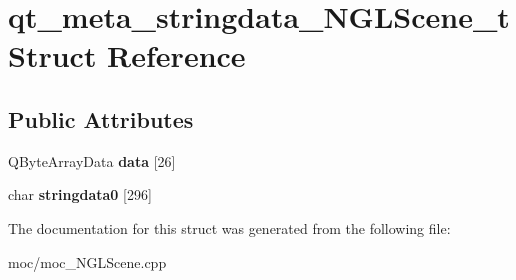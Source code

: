\hypertarget{structqt__meta__stringdata__NGLScene__t}{\section{qt\-\_\-meta\-\_\-stringdata\-\_\-\-N\-G\-L\-Scene\-\_\-t Struct Reference}
\label{structqt__meta__stringdata__NGLScene__t}
}
\subsection*{Public Attributes}
\begin{DoxyCompactItemize}
\item 
\hypertarget{structqt__meta__stringdata__NGLScene__t_a728fa62392c3b5b85ed1cd408bc3f0e2}{Q\-Byte\-Array\-Data {\bfseries data} \mbox{[}26\mbox{]}}\label{structqt__meta__stringdata__NGLScene__t_a728fa62392c3b5b85ed1cd408bc3f0e2}

\item 
\hypertarget{structqt__meta__stringdata__NGLScene__t_a3c692b71b22d5950a17b11a0cd819cb0}{char {\bfseries stringdata0} \mbox{[}296\mbox{]}}\label{structqt__meta__stringdata__NGLScene__t_a3c692b71b22d5950a17b11a0cd819cb0}

\end{DoxyCompactItemize}


The documentation for this struct was generated from the following file\-:\begin{DoxyCompactItemize}
\item 
moc/moc\-\_\-\-N\-G\-L\-Scene.\-cpp\end{DoxyCompactItemize}
